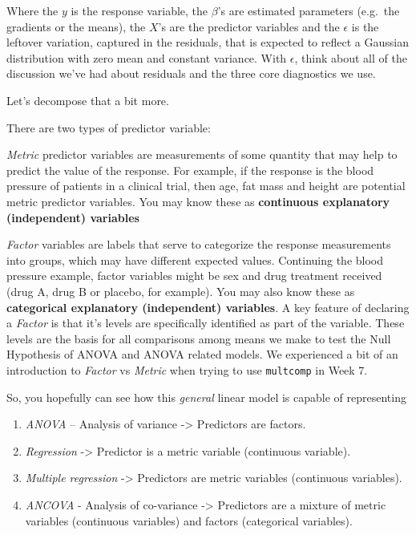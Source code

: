 \documentclass[
]{book}
\providecommand{\tightlist}{%
  \setlength{\itemsep}{0pt}\setlength{\parskip}{0pt}}
\begin{document}
Where the \(y\) is the response variable, the \(\beta\)'s are estimated parameters (e.g.~the gradients or the means), the \(X\)'s are the predictor variables and the \(\epsilon\) is the leftover variation, captured in the residuals, that is expected to reflect a Gaussian distribution with zero mean and constant variance. With \(\epsilon\), think about all of the discussion we've had about residuals and the three core diagnostics we use.

Let's decompose that a bit more.

There are two types of predictor variable:

\emph{Metric} predictor variables are measurements of some quantity that may help to predict the value of the response. For example, if the response is the blood pressure of patients in a clinical trial, then age, fat mass and height are potential metric predictor variables. You may know these as \textbf{continuous explanatory (independent) variables}

\emph{Factor} variables are labels that serve to categorize the response measurements into groups, which may have different expected values. Continuing the blood pressure example, factor variables might be sex and drug treatment received (drug A, drug B or placebo, for example). You may also know these as \textbf{categorical explanatory (independent) variables}. A key feature of declaring a \emph{Factor} is that it's levels are specifically identified as part of the variable. These levels are the basis for all comparisons among means we make to test the Null Hypothesis of ANOVA and ANOVA related models. We experienced a bit of an introduction to \emph{Factor} vs \emph{Metric} when trying to use \texttt{multcomp} in Week 7.

So, you hopefully can see how this \emph{general} linear model is capable of representing

\begin{enumerate}
\def\labelenumi{\arabic{enumi}.}
\tightlist
\item
  \emph{ANOVA} -- Analysis of variance -\textgreater{} Predictors are factors.
\item
  \emph{Regression} -\textgreater{} Predictor is a metric variable (continuous variable).\\
\item
  \emph{Multiple regression} -\textgreater{} Predictors are metric variables (continuous variables).
\item
  \emph{ANCOVA} - Analysis of co-variance -\textgreater{} Predictors are a mixture of metric variables (continuous variables) and factors (categorical variables).
\end{enumerate}
\end{document}
